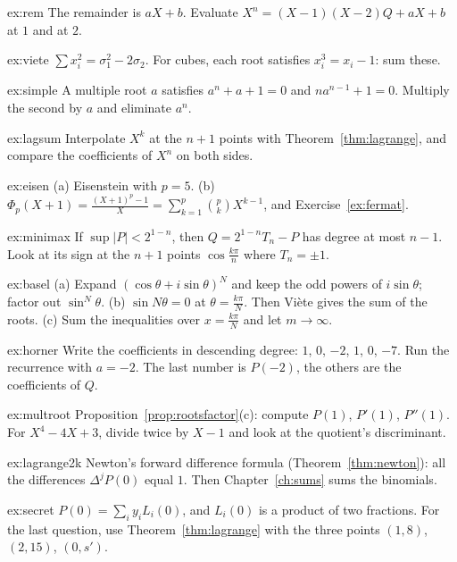 \begin{hint}{ex:rem}
The remainder is $aX+b$. Evaluate $X^n=(X-1)(X-2)Q+aX+b$ at $1$ and at $2$.
\end{hint}
\begin{hint}{ex:viete}
$\sum x_i^2=\sigma_1^2-2\sigma_2$. For cubes, each root satisfies $x_i^3=x_i-1$: sum these.
\end{hint}
\begin{hint}{ex:simple}
A multiple root $a$ satisfies $a^n+a+1=0$ and $na^{n-1}+1=0$. Multiply the second by $a$ and eliminate $a^n$.
\end{hint}
\begin{hint}{ex:lagsum}
Interpolate $X^k$ at the $n+1$ points with Theorem~\ref{thm:lagrange}, and compare the coefficients of $X^n$ on both sides.
\end{hint}
\begin{hint}{ex:eisen}
(a) Eisenstein with $p=5$. (b) $\Phi_p(X+1)=\frac{(X+1)^p-1}X=\sum_{k=1}^p\binom pkX^{k-1}$, and Exercise~\ref{ex:fermat}.
\end{hint}
\begin{hint}{ex:minimax}
If $\sup|P|<2^{1-n}$, then $Q=2^{1-n}T_n-P$ has degree at most $n-1$. Look at its sign at the $n+1$ points $\cos\frac{k\pi}n$ where $T_n=\pm1$.
\end{hint}
\begin{hint}{ex:basel}
(a) Expand $(\cos\theta+i\sin\theta)^N$ and keep the odd powers of $i\sin\theta$; factor out $\sin^N\theta$. (b) $\sin N\theta=0$ at $\theta=\frac{k\pi}N$. Then Vi\`ete gives the sum of the roots. (c) Sum the inequalities over $x=\frac{k\pi}N$ and let $m\to\infty$.
\end{hint}
\begin{hint}{ex:horner}
Write the coefficients in descending degree: $1$, $0$, $-2$, $1$, $0$, $-7$. Run the recurrence with $a=-2$. The last number is $P(-2)$, the others are the coefficients of $Q$.
\end{hint}
\begin{hint}{ex:multroot}
Proposition~\ref{prop:rootsfactor}(c): compute $P(1)$, $P'(1)$, $P''(1)$. For $X^4-4X+3$, divide twice by $X-1$ and look at the quotient's discriminant.
\end{hint}
\begin{hint}{ex:lagrange2k}
Newton's forward difference formula (Theorem~\ref{thm:newton}): all the differences $\Delta^jP(0)$ equal $1$. Then Chapter~\ref{ch:sums} sums the binomials.
\end{hint}
\begin{hint}{ex:secret}
$P(0)=\sum_iy_iL_i(0)$, and $L_i(0)$ is a product of two fractions. For the last question, use Theorem~\ref{thm:lagrange} with the three points $(1,8)$, $(2,15)$, $(0,s')$.
\end{hint}
